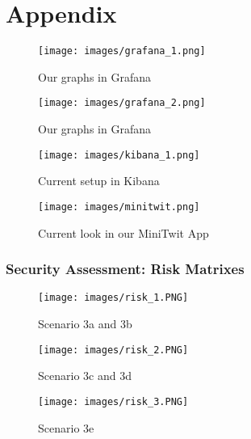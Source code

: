 \documentclass{article}
\begin{document}
\newpage

\section{Appendix}
\begin{figure}[h!]
    \centering
    \texttt{[image: images/grafana\_1.png]}
    \caption{ Our graphs in Grafana }
\end{figure}

\begin{figure}[h!]
    \centering
    \texttt{[image: images/grafana\_2.png]}
    \caption{ Our graphs in Grafana }
\end{figure}

\begin{figure}[h!]
    \centering
    \texttt{[image: images/kibana\_1.png]}
    \caption{ Current setup in Kibana }
\end{figure}

\begin{figure}[h!]
    \centering
    \texttt{[image: images/minitwit.png]}
    \caption{ Current look in our MiniTwit App }
\end{figure}

\newpage
\subsubsection{Security Assessment: Risk Matrixes}
\begin{figure}[h!]
    \centering
    \texttt{[image: images/risk\_1.PNG]}
    \caption{ Scenario 3a and 3b }
\end{figure}

\begin{figure}[h!]
    \centering
    \texttt{[image: images/risk\_2.PNG]}
    \caption{ Scenario 3c and 3d }
\end{figure}

\begin{figure}[h!]
    \centering
    \texttt{[image: images/risk\_3.PNG]}
    \caption{ Scenario 3e }
\end{figure}
\end{document}
